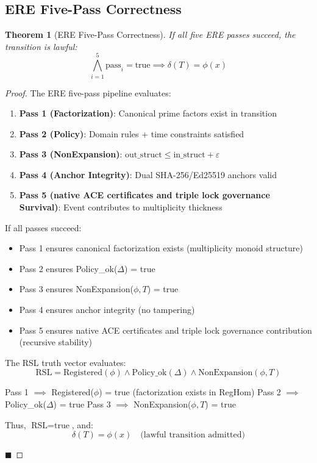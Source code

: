 \documentclass[11pt,a4paper]{article}
\newtheorem{theorem}{Theorem}[section]
\begin{document}
\subsection{ERE Five-Pass Correctness}

\begin{theorem}[ERE Five-Pass Correctness]\label{thm:ere_correctness}
If all five ERE passes succeed, the transition is lawful:
$$\bigwedge_{i=1}^5 \text{pass}_i = \text{true} \implies \delta(T) = \phi(x)$$
\end{theorem}

\begin{proof}
The ERE five-pass pipeline evaluates:
\begin{enumerate}
    \item \textbf{Pass 1 (Factorization)}: Canonical prime factors exist in transition
    \item \textbf{Pass 2 (Policy)}: Domain rules + time constraints satisfied
    \item \textbf{Pass 3 (NonExpansion)}: $\text{out\_struct} \leq \text{in\_struct} + \varepsilon$
    \item \textbf{Pass 4 (Anchor Integrity)}: Dual SHA-256/Ed25519 anchors valid
    \item \textbf{Pass 5 (native ACE certificates and triple lock governance Survival)}: Event contributes to multiplicity thickness
\end{enumerate}

If all passes succeed:
\begin{itemize}
    \item Pass 1 ensures canonical factorization exists (multiplicity monoid structure)
    \item Pass 2 ensures Policy\_ok($\Delta$) = true
    \item Pass 3 ensures NonExpansion($\phi, T$) = true
    \item Pass 4 ensures anchor integrity (no tampering)
    \item Pass 5 ensures native ACE certificates and triple lock governance contribution (recursive stability)
\end{itemize}

The RSL truth vector evaluates:
$$\text{RSL} = \text{Registered}(\phi) \land \text{Policy\_ok}(\Delta) \land \text{NonExpansion}(\phi, T)$$

Pass 1 $\implies$ Registered($\phi$) = true (factorization exists in RegHom)
Pass 2 $\implies$ Policy\_ok($\Delta$) = true
Pass 3 $\implies$ NonExpansion($\phi, T$) = true

Thus, $\text{RSL} = \text{true}$, and:
$$\delta(T) = \phi(x) \quad \text{(lawful transition admitted)}$$

\hfill $\blacksquare$
\end{proof}
\end{document}

